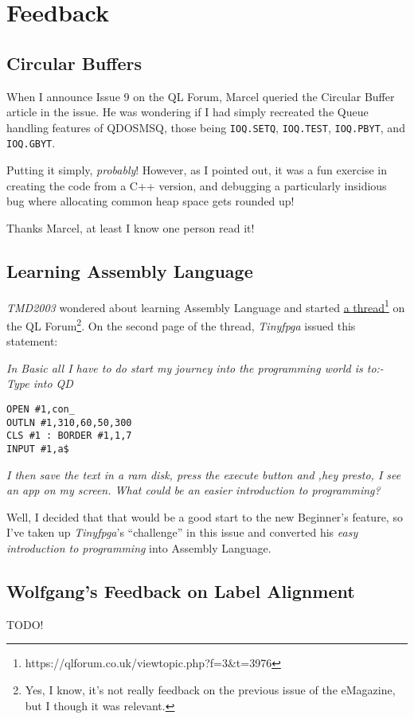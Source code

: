 
\chapter{Feedback}

\section{Circular Buffers}

When I announce Issue 9 on the QL Forum, Marcel queried the Circular
Buffer article in the issue. He was wondering if I had simply recreated
the Queue handling features of QDOSMSQ, those being \texttt{IOQ.SETQ},
\texttt{IOQ.TEST}, \texttt{IOQ.PBYT}, and \texttt{IOQ.GBYT}. 

Putting it simply, \emph{probably}! However, as I pointed out, it
was a fun exercise in creating the code from a C++ version, and debugging
a particularly insidious bug where allocating common heap space gets
rounded up!

Thanks Marcel, at least I know one person read it!

\section{Learning Assembly Language}

\emph{TMD2003} wondered about learning Assembly Language and started
\href{https://qlforum.co.uk/viewtopic.php?f=3&t=3976}{a thread}\footnote{https://qlforum.co.uk/viewtopic.php?f=3\&t=3976}
on the QL Forum\footnote{Yes, I know, it's not really feedback on the previous issue of the
eMagazine, but I though it was relevant.}. On the second page of the thread, \emph{Tinyfpga} issued this statement:

\emph{In Basic all I have to do start my journey into the programming
world is to:- Type into QD}

\begin{lstlisting}
OPEN #1,con_ 
OUTLN #1,310,60,50,300 
CLS #1 : BORDER #1,1,7 
INPUT #1,a$
\end{lstlisting}

\emph{I then save the text in a ram disk, press the execute button
and ,\textquotedbl hey presto\textquotedbl , I see an app on my
screen. What could be an easier introduction to programming?}

Well, I decided that that would be a good start to the new Beginner's
feature, so I've taken up \emph{Tinyfpga}'s ``challenge'' in this
issue and converted his \emph{easy introduction to programming} into
Assembly Language.

\section{Wolfgang's Feedback on Label Alignment}

TODO!
